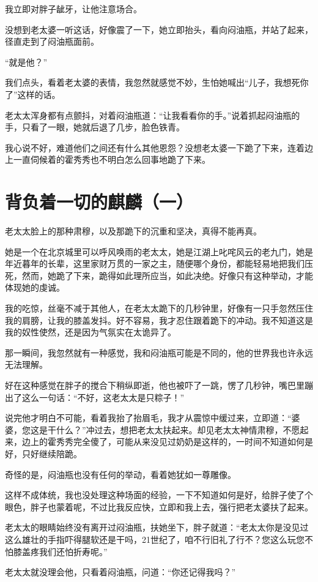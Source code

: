 我立即对胖子龇牙，让他注意场合。

没想到老太婆一听这话，好像震了一下，她立即抬头，看向闷油瓶，并站了起来，径直走到了闷油瓶面前。

“就是他？”

我们点头，看着老太婆的表情，我忽然就感觉不妙，生怕她喊出“儿子，我想死你了”这样的话。

老太太浑身都有点颤抖，对着闷油瓶道：“让我看看你的手。”说着抓起闷油瓶的手，只看了一眼，她就后退了几步，脸色铁青。

我心说不好，难道他们之间还有什么其他恩怨？没想老太婆一下跪了下来，连着边上一直伺候着的霍秀秀也不明白怎么回事地跪了下来。

\chapter{背负着一切的麒麟（一）}

老太太脸上的那种肃穆，以及那跪下的沉重和坚决，真得不能再真。

她是一个在北京城里可以呼风唤雨的老太太，她是江湖上叱咤风云的老九门，她是年近暮年的长辈，这里家财万贯的一家之主，随便哪个身份，都能轻易地把我们压死，然而，她跪了下来，跪得如此理所应当，如此决绝。好像只有这种举动，才能体现她的虔诚。

我的吃惊，丝毫不减于其他人，在老太太跪下的几秒钟里，好像有一只手忽然压住我的肩膀，让我的膝盖发抖。好不容易，我才忍住跟着跪下的冲动。我不知道这是我的奴性使然，还是因为气氛实在太诡异了。

那一瞬间，我忽然就有一种感觉，我和闷油瓶可能是不同的，他的世界我也许永远无法理解。

好在这种感觉在胖子的搅合下稍纵即逝，他也被吓了一跳，愣了几秒钟，嘴巴里蹦出了这么一句话：“不好，这老太太是只粽子！”

说完他才明白不可能，看着我抬了抬眉毛，我才从震惊中缓过来，立即道：“婆婆，您这是干什么？”冲过去，想把老太太扶起来。却见老太太神情肃穆，不愿起来，边上的霍秀秀完全傻了，可能从来没见过奶奶是这样的，一时间不知道如何是好，只好继续陪跪。

奇怪的是，闷油瓶也没有任何的举动，看着她犹如一尊雕像。

这样不成体统，我也没处理这种场面的经验，一下不知道如何是好，给胖子使了个眼色，胖子也蒙着呢，不过比我反应快，立即和我上去，强行把老太婆扶了起来。

老太太的眼睛始终没有离开过闷油瓶，扶她坐下，胖子就道：“老太太你是没见过这么雄壮的手指吓得腿软还是干吗，21世纪了，咱不行旧礼了行不？您这么玩您不怕膝盖疼我们还怕折寿呢。”

老太太就没理会他，只看着闷油瓶，问道：“你还记得我吗？”

